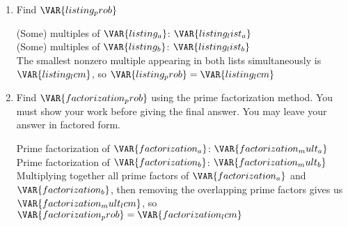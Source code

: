 
\begin{enumerate}

    \item Find $\VAR{listing_prob}$ 

    \vfill

    \begin{ansenv}
        (Some) multiples of $\VAR{listing_a}$: $\VAR{listing_list_a}$\\

        (Some) multiples of $\VAR{listing_b}$: $\VAR{listing_list_b}$\\

        The smallest nonzero multiple appearing in both lists simultaneously is $\VAR{listing_lcm}$, so $\VAR{listing_prob} = \VAR{listing_lcm}$
    \end{ansenv}

    \vfill

    \item Find $\VAR{factorization_prob}$ using the prime factorization method. You must show your work before giving the final answer. You may leave your answer in factored form.

    \vfill

    \begin{ansenv}
        Prime factorization of $\VAR{factorization_a}$: $\VAR{factorization_mult_a}$\\

        Prime factorization of $\VAR{factorization_b}$: $\VAR{factorization_mult_b}$\\

        Multiplying together all prime factors of $\VAR{factorization_a}$ and $\VAR{factorization_b}$, then removing the overlapping prime factors gives us $\VAR{factorization_mult_lcm}$, so $\VAR{factorization_prob} = \VAR{factorization_lcm}$
    \end{ansenv}

    \vfill

\end{enumerate}

\trueemptypage